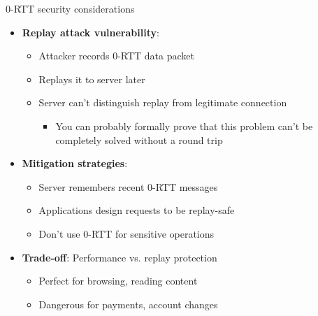 \documentclass[aspectratio=169, lualatex, handout]{beamer}
\begin{document}
\begin{frame}{0-RTT security considerations}
	\begin{itemize}
		\item \textbf{Replay attack vulnerability}:
		      \begin{itemize}
			      \item Attacker records 0-RTT data packet
			      \item Replays it to server later
			      \item Server can't distinguish replay from legitimate connection
			            \begin{itemize}
				            \item You can probably formally prove that this problem can't be completely solved without a round trip
			            \end{itemize}
		      \end{itemize}
		\item \textbf{Mitigation strategies}:
		      \begin{itemize}
			      \item Server remembers recent 0-RTT messages
			      \item Applications design requests to be replay-safe
			      \item Don't use 0-RTT for sensitive operations
		      \end{itemize}
		\item \textbf{Trade-off}: Performance vs. replay protection
		      \begin{itemize}
			      \item Perfect for browsing, reading content
			      \item Dangerous for payments, account changes
		      \end{itemize}
	\end{itemize}
\end{frame}
\end{document}
